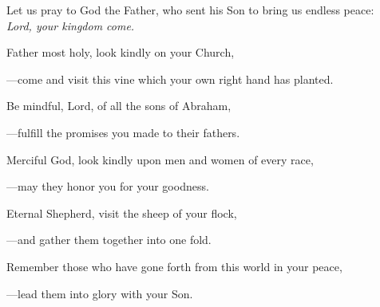 \intercessions\indent

\begin{hangpar}

Let us pray to God the Father, who sent his Son to bring us endless peace:\\
\emph{Lord, your kingdom come.}

\medskip Father most holy, look kindly on your Church,

{\color{red}---\thinspace}come and visit this vine which your own right hand has planted.

\medskip Be mindful, Lord, of all the sons of Abraham,

{\color{red}---\thinspace}fulfill the promises you made to their fathers.

\medskip Merciful God, look kindly upon men and women of every race,

{\color{red}---\thinspace}may they honor you for your goodness.

\medskip Eternal Shepherd, visit the sheep of your flock,

{\color{red}---\thinspace}and gather them together into one fold.

\medskip Remember those who have gone forth from this world in your peace,

{\color{red}---\thinspace}lead them into glory with your Son.

\end{hangpar}